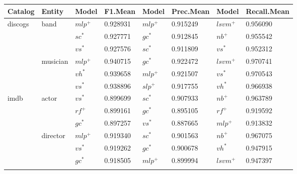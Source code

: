 \documentclass[epsfig,a4paper,11pt,titlepage,twoside,openany]{book}
\begin{document}
\begin{table}[H]
\centering
\begin{tabular}{|l|l|ll|ll|ll|}
\hline
Catalog                      & Entity                    & Model & F1.Mean  & Model & Prec.Mean & Model                & Recall.Mean \\ \hline
\multirow{6}{*}{discogs}     & \multirow{3}{*}{band}     & $mlp^+$  & 0.928931 & $mlp^+$   & 0.915249  & $lsvm^+$                 & 0.956090    \\
                             &                           & $sc^*$    & 0.927771 & $gc^*$    & 0.912845  & $nb^+$                   & 0.955542    \\
                             &                           & $vs^*$    & 0.927576 & $sc^*$    & 0.911809  & $vs^*$                   & 0.952312    \\ \cline{2-8} 
                             & \multirow{3}{*}{musician} & $mlp^+$   & 0.940715 & $gc^*$    & 0.922472  & $lsvm^+$                 & 0.970741    \\
                             &                           & $vh^*$    & 0.939658 & $mlp^+$   & 0.921507  & $vs^*$                   & 0.970543    \\
                             &                           & $vs^*$    & 0.938896 & $slp^+$   & 0.917755  & $vh^*$                   & 0.966938    \\ \hline
\multirow{15}{*}{imdb}       & \multirow{3}{*}{actor}    & $vs^*$    & 0.899699 & $sc^*$    & 0.907933  & $nb^+$                   & 0.963789    \\
                             &                           & $rf^+$    & 0.899161 & $gc^*$    & 0.895105  & $rf^+$                   & 0.919592    \\
                             &                           & $gc^*$    & 0.897257 & $vs^*$    & 0.887665  & $mlp^+$                  & 0.913832    \\ \cline{2-8} 
                             & \multirow{3}{*}{director} & $mlp^+$   & 0.919340 & $sc^*$    & 0.901563  & $nb^+$                   & 0.967075    \\
                             &                           & $vs^*$    & 0.919262 & $gc^*$    & 0.900678  & $vh^*$                   & 0.947915    \\
                             &                           & $gc^*$    & 0.918505 & $mlp^+$   & 0.899994  & $lsvm^+$                 & 0.947397    \\ \cline{2-8} 

\end{tabular}
\end{table}
\end{document}
